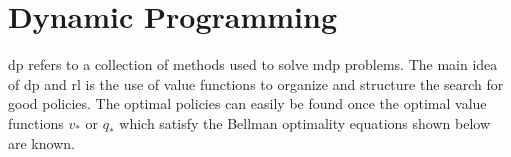 \section{Dynamic Programming}
\gls{dp} refers to a collection of methods used to solve \gls{mdp} problems.
The main idea of \gls{dp} and \gls{rl} is the use of value functions to organize and structure the search for good policies.
The optimal policies can easily be found once the optimal value functions $v_*$ or $q_*$ which satisfy the Bellman optimality equations shown below are known.

